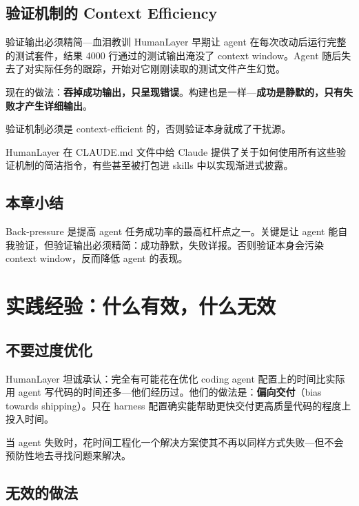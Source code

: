 \documentclass[a4paper]{article}
\begin{document}
\subsection{验证机制的 Context Efficiency}

\begin{warningbox}{验证输出必须精简---血泪教训}
HumanLayer 早期让 agent 在每次改动后运行完整的测试套件，结果 4000 行通过的测试输出淹没了 context window。Agent 随后失去了对实际任务的跟踪，开始对它刚刚读取的测试文件产生幻觉。

现在的做法：\textbf{吞掉成功输出，只呈现错误}。构建也是一样---\textbf{成功是静默的，只有失败才产生详细输出}。

验证机制必须是 context-efficient 的，否则验证本身就成了干扰源。
\end{warningbox}

HumanLayer 在 CLAUDE.md 文件中给 Claude 提供了关于如何使用所有这些验证机制的简洁指令，有些甚至被打包进 skills 中以实现渐进式披露。

\subsection{本章小结}

Back-pressure 是提高 agent 任务成功率的最高杠杆点之一。关键是让 agent 能自我验证，但验证输出必须精简：成功静默，失败详报。否则验证本身会污染 context window，反而降低 agent 的表现。


\section{实践经验：什么有效，什么无效}

\subsection{不要过度优化}

HumanLayer 坦诚承认：完全有可能花在优化 coding agent 配置上的时间比实际用 agent 写代码的时间还多---他们经历过。他们的做法是：\textbf{偏向交付}（bias towards shipping）。只在 harness 配置确实能帮助更快交付更高质量代码的程度上投入时间。

当 agent 失败时，花时间工程化一个解决方案使其不再以同样方式失败---但不会预防性地去寻找问题来解决。

\subsection{无效的做法}
\end{document}
